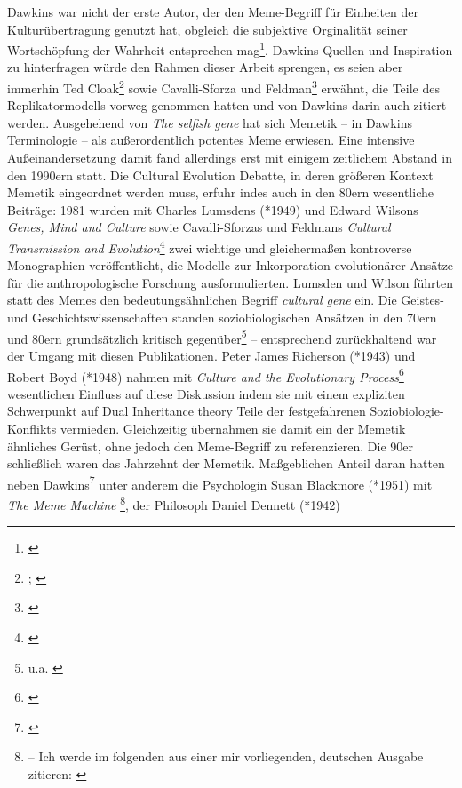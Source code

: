\documentclass[openany,twoside,twocolumn]{book}
\let\rmarkdownfootnote\footnote%
\def\footnote{\protect\rmarkdownfootnote}
\begin{document}
Dawkins war nicht der erste Autor, der den Meme-Begriff für Einheiten
der Kulturübertragung genutzt hat, obgleich die subjektive Orginalität
seiner Wortschöpfung der Wahrheit entsprechen mag\footnote{\textcite{laurent_note_1999}}.
Dawkins Quellen und Inspiration zu hinterfragen würde den Rahmen dieser
Arbeit sprengen, es seien aber immerhin Ted Cloak\footnote{\textcite{cloak_cultural_1966};
  \textcite{cloak_is_1975}} sowie Cavalli-Sforza und Feldman\footnote{\textcite{cavalli-sforza_models_1973}}
erwähnt, die Teile des Replikatormodells vorweg genommen hatten und von
Dawkins darin auch zitiert werden. Ausgehehend von \emph{The selfish
gene} hat sich Memetik -- in Dawkins Terminologie -- als außerordentlich
potentes Meme erwiesen. Eine intensive Außeinandersetzung damit fand
allerdings erst mit einigem zeitlichem Abstand in den 1990ern statt. Die
Cultural Evolution Debatte, in deren größeren Kontext Memetik
eingeordnet werden muss, erfuhr indes auch in den 80ern wesentliche
Beiträge: 1981 wurden mit Charles Lumsdens (*1949) und Edward Wilsons
\emph{Genes, Mind and Culture} \autocite{lumsden_genes_1981} sowie
Cavalli-Sforzas und Feldmans \emph{Cultural Transmission and
Evolution}\footnote{\textcite{cavalli-sforza_cultural_1981}} zwei
wichtige und gleichermaßen kontroverse Monographien veröffentlicht, die
Modelle zur Inkorporation evolutionärer Ansätze für die anthropologische
Forschung ausformulierten. Lumsden und Wilson führten statt des Memes
den bedeutungsähnlichen Begriff \emph{cultural gene} ein. Die Geistes-
und Geschichtswissenschaften standen soziobiologischen Ansätzen in den
70ern und 80ern grundsätzlich kritisch gegenüber\footnote{u.a.
  \textcite{sahlins_use_1976}} -- entsprechend zurückhaltend war der
Umgang mit diesen Publikationen. Peter James Richerson (*1943) und
Robert Boyd (*1948) nahmen mit \emph{Culture and the Evolutionary
Process}\footnote{\textcite{boyd_culture_1985}} wesentlichen Einfluss
auf diese Diskussion indem sie mit einem expliziten Schwerpunkt auf Dual
Inheritance theory Teile der festgefahrenen Soziobiologie-Konflikts
vermieden. Gleichzeitig übernahmen sie damit ein der Memetik ähnliches
Gerüst, ohne jedoch den Meme-Begriff zu referenzieren. Die 90er
schließlich waren das Jahrzehnt der Memetik. Maßgeblichen Anteil daran
hatten neben Dawkins\footnote{\textcite{dawkins_viruses_1993}} unter
anderem die Psychologin Susan Blackmore (*1951) mit \emph{The Meme
Machine} \footnote{\textcite{blackmore_meme_1999} -- Ich werde im
  folgenden aus einer mir vorliegenden, deutschen Ausgabe zitieren:
  \textcite{blackmore_macht_2000}}, der Philosoph Daniel Dennett (*1942)
\end{document}
